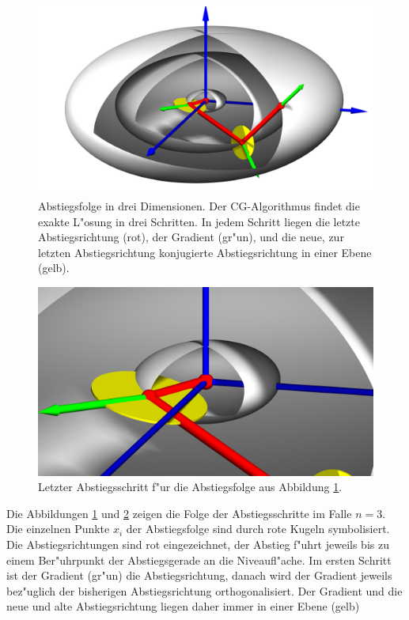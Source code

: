 \begin{figure}
\begin{center}
\includegraphics[width=\hsize]{graphics/cg3d-large.jpg}
\end{center}
\caption{Abstiegsfolge in drei Dimensionen. Der CG-Algorithmus findet
die exakte L"osung in drei Schritten. In jedem Schritt liegen die
letzte Abstiegsrichtung (rot), der Gradient (gr"un), und die neue, zur letzten
Abstiegsrichtung konjugierte Abstiegsrichtung in einer Ebene (gelb).
\label{cg3d-large}}
\end{figure}
\begin{figure}
\begin{center}
\includegraphics[width=\hsize]{graphics/cg3d-center.jpg}
\end{center}
\caption{Letzter Abstiegsschritt f"ur die Abstiegsfolge aus Abbildung
\ref{cg3d-large}.
\label{cg3d-center}}
\end{figure}

Die Abbildungen \ref{cg3d-large} und \ref{cg3d-center} zeigen die Folge
der Abstiegsschritte im Falle $n=3$.
Die einzelnen Punkte $x_i$ der Abstiegsfolge sind durch rote Kugeln
symbolisiert.
Die Abstiegsrichtungen sind rot eingezeichnet, der Abstieg f"uhrt 
jeweils bis zu einem Ber"uhrpunkt der Abstiegsgerade an die
Niveaufl"ache.
Im ersten Schritt ist der Gradient (gr"un) die Abstiegsrichtung,
danach wird der Gradient jeweils bez"uglich der bisherigen Abstiegsrichtung
orthogonalisiert.
Der Gradient und die neue und alte Abstiegsrichtung liegen daher immer
in einer Ebene (gelb)

